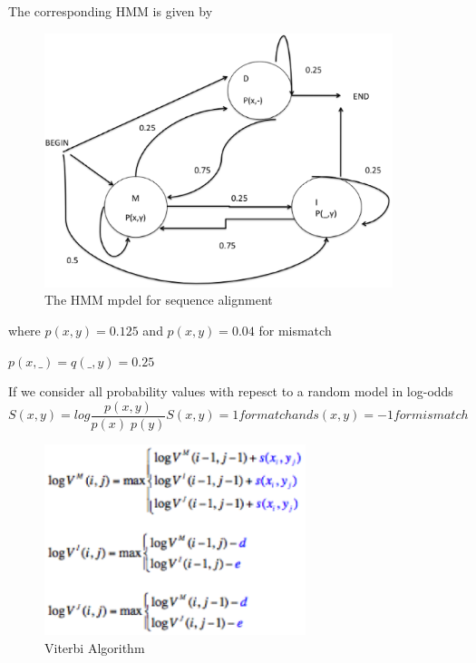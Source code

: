 \documentclass[english, a4paper,11pt]{article}
\begin{document}
The corresponding HMM is given by

%
\begin{figure}
\begin{centering}
\includegraphics[width=4in]{Slide5}
\par\end{centering}

\caption{The HMM mpdel for sequence alignment}
%
\end{figure}


where $p(x,y)=0.125$ and $p(x,y)=0.04$ for mismatch

$p(x,\_)=q(\_,y)=0.25$

If we consider all probability values with repesct to a random model
in log-odds
$$
S(x,y)=log\frac{p(x,y)}{p(x)\; p(y)}

S(x,y)=1 for match and s(x,y)=-1 for mismatch
$$

%
\begin{figure}
\begin{centering}
\includegraphics[width=3in]{Viterbi}
\par\end{centering}

\caption{Viterbi Algorithm}
%
\end{figure}
\end{document}

